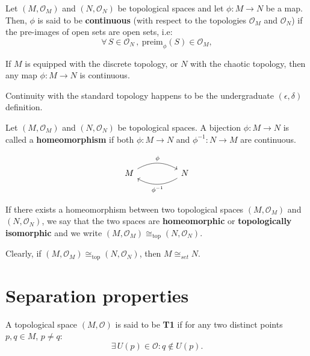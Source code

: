 \documentclass[root.tex]{subfiles}
\begin{document}
\begin{mydef}
Let $(M,\mathcal{O}_M)$ and $(N,\mathcal{O}_N)$ be topological spaces and let $\phi: M\to N$ be a map. Then, $\phi$ is said to be \textbf{continuous} (with respect to the topologies $\mathcal{O}_M$ and $\mathcal{O}_N$) if the pre-images of open sets are open sets, i.e:
$$
\forall \, S \in \mathcal{O}_N \, , \ \mathrm{preim}_\phi(S) \in \mathcal{O}_M ,
$$

\end{mydef}

\begin{myex}
If $M$ is equipped with the discrete topology, or $N$ with the chaotic topology, then any map $\phi: M \to N$ is continuous. 
\end{myex}
\begin{myex}
  Continuity with the standard topology happens to be the undergraduate $(\epsilon, \delta)$ definition. 
\end{myex}

\begin{mydef}
Let $(M,\mathcal{O}_M)$ and $(N,\mathcal{O}_N)$ be topological spaces. A bijection $\phi: M\to N$ is called a \textbf{homeomorphism} if both $\phi: M\to N$ and $\phi^{-1}: N\to M$ are continuous.
\end{mydef}

$$
\begin{tikzcd}
M \arrow[rr, bend left,"\phi"] & & N \arrow[ll, bend left,"\phi^{-1}"]
\end{tikzcd}
$$

\begin{mydef}
If there exists a homeomorphism between two topological spaces $(M,\mathcal{O}_M)$ and $(N,\mathcal{O}_N)$, we say that the two spaces are \textbf{homeomorphic} or \textbf{topologically isomorphic} and we write $(M,\mathcal{O}_M) \cong_\mathrm{top} (N,\mathcal{O}_N)$.
\end{mydef}

Clearly, if $(M,\mathcal{O}_M) \cong_\mathrm{top} (N,\mathcal{O}_N)$, then $M \cong_{set} N$.

\section{Separation properties}
%
\begin{mydef}
  A topological space $(M,\mathcal{O})$ is said to be \textbf{T1} if for any two distinct points $p,q\in M$, $p\neq q$:
$$
\exists \, U(p) \in \mathcal{O} : q \notin U(p).
$$
\end{mydef}
\end{document}
